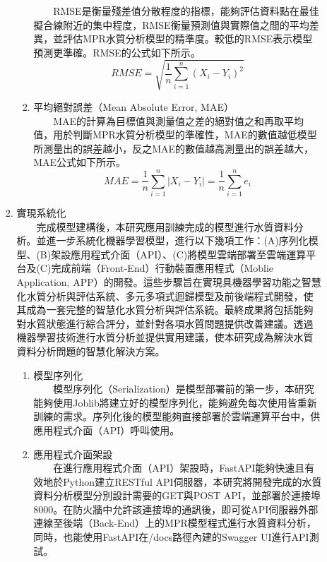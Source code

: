 \documentclass[12pt,a4paper]{article}
\begin{document}
\begin{enumerate}
\begin{enumerate}[label=\arabic*.]
\begin{enumerate}[label=2-2-\arabic*.]
\begin{enumerate}[label=\Alph*.]
                　　RMSE是衡量殘差值分散程度的指標，能夠評估資料點在最佳擬合線附近的集中程度，RMSE衡量預測值與實際值之間的平均差異，並評估MPR水質分析模型的精準度。較低的RMSE表示模型預測更準確。RMSE的公式如下所示。
                    \begin{equation}
                    RMSE = \sqrt{\frac{1}{n} \sum_{i=1}^n (X_i - Y_i)^2}
                    \end{equation}
                \item 平均絕對誤差（Mean Absolute Error, MAE）\\
                　　MAE的計算為目標值與測量值之差的絕對值之和再取平均值，用於判斷MPR水質分析模型的準確性，MAE的數值越低模型所測量出的誤差越小，反之MAE的數值越高測量出的誤差越大，MAE公式如下所示。
                    \begin{equation}
                    MAE = \frac{1}{n} \sum_{i=1}^n |X_i - Y_i| = \frac{1}{n} \sum_{i=1}^n e_i
                    \end{equation}
            \end{enumerate}
        \item 實現系統化\\
        　　完成模型建構後，本研究應用訓練完成的模型進行水質資料分析。並進一步系統化機器學習模型，進行以下幾項工作：(A)序列化模型、(B)架設應用程式介面（API）、(C)將模型雲端部署至雲端運算平台及(C)完成前端（Front-End）行動裝置應用程式（Moblie Application, APP）的開發。這些步驟旨在實現具機器學習功能之智慧化水質分析與評估系統、多元多項式迴歸模型及前後端程式開發，使其成為一套完整的智慧化水質分析與評估系統。最終成果將包括能夠對水質狀態進行綜合評分，並針對各項水質問題提供改善建議。透過機器學習技術進行水質分析並提供實用建議，使本研究成為解決水質資料分析問題的智慧化解決方案。
            \begin{enumerate}[label=\Alph*.]
                \item 模型序列化\\
                　　模型序列化（Serialization）是模型部署前的第一步，本研究能夠使用Joblib將建立好的模型序列化，能夠避免每次使用皆重新訓練的需求。序列化後的模型能夠直接部署於雲端運算平台中，供應用程式介面（API）呼叫使用。
                \item 應用程式介面架設\\
                　　在進行應用程式介面（API）架設時，FastAPI能夠快速且有效地於Python建立RESTful API伺服器，本研究將開發完成的水質資料分析模型分別設計需要的GET與POST API，並部署於連接埠8000。在防火牆中允許該連接埠的通訊後，即可從API伺服器外部連線至後端（Back-End）上的MPR模型程式進行水質資料分析，同時，也能使用FastAPI在/docs路徑內建的Swagger UI進行API測試。

\end{enumerate}
\end{enumerate}
\end{enumerate}
\end{enumerate}
\end{document}
